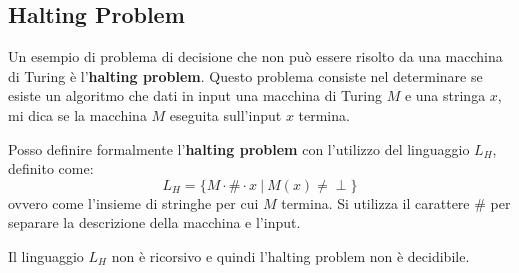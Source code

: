 \subsection{Halting Problem}
Un esempio di problema di decisione che non può essere risolto da una macchina di
Turing è l'\textbf{halting problem}. Questo problema consiste nel determinare
se esiste un algoritmo che dati in input una macchina di Turing $M$ e una stringa
$x$, mi dica se la macchina $M$ eseguita sull'input $x$ termina.
\begin{definizione}
    Posso definire formalmente l'\textbf{halting problem} con l'utilizzo del
    linguaggio $L_H$, definito come:
    \begin{equation}
        L_H = \{M \cdot \# \cdot x \ | \ M(x) \neq \perp \}
    \end{equation}
    ovvero come l'insieme di stringhe per cui $M$ termina. Si utilizza il carattere
    $\#$ per separare la descrizione della macchina e l'input.
\end{definizione}
\begin{teorema}
    Il linguaggio $L_H$ non è ricorsivo e quindi l'halting problem non è decidibile.
\end{teorema}
